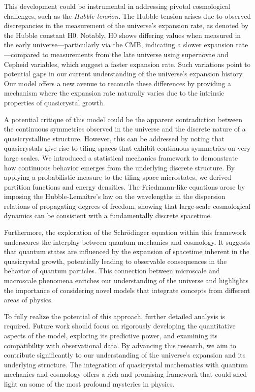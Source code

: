 \documentclass[sn-mathphys-num]{sn-jnl}%
\begin{document}
This development could be instrumental in addressing pivotal cosmological challenges, such as the \emph{Hubble tension}. The Hubble tension arises due to observed discrepancies in the measurement of the universe's expansion rate, as denoted by the Hubble constant H0. Notably, H0 shows differing values when measured in the early universe—particularly via the CMB, indicating a slower expansion rate—compared to measurements from the late universe using supernovae and Cepheid variables, which suggest a faster expansion rate. Such variations point to potential gaps in our current understanding of the universe's expansion history. Our model offers a new avenue to reconcile these differences by providing a mechanism where the expansion rate naturally varies due to the intrinsic properties of quasicrystal growth.

A potential critique of this model could be the apparent contradiction between the continuous symmetries observed in the universe and the discrete nature of a quasicrystalline structure. However, this can be addressed by noting that quasicrystals give rise to tiling spaces that exhibit continuous symmetries on very large scales. We introduced a statistical mechanics framework to demonstrate how continuous behavior emerges from the underlying discrete structure. By applying a probabilistic measure to the tiling space microstates, we derived partition functions and energy densities. The Friedmann-like equations arose by imposing the Hubble-Lemaître's law on the wavelengths in the dispersion relations of propagating degrees of freedom, showing that large-scale cosmological dynamics can be consistent with a fundamentally discrete spacetime.

Furthermore, the exploration of the Schr{\"o}dinger equation within this framework underscores the interplay between quantum mechanics and cosmology. It suggests that quantum states are influenced by the expansion of spacetime inherent in the quasicrystal growth, potentially leading to observable consequences in the behavior of quantum particles. This connection between microscale and macroscale phenomena enriches our understanding of the universe and highlights the importance of considering novel models that integrate concepts from different areas of physics.

To fully realize the potential of this approach, further detailed analysis is required. Future work should focus on rigorously developing the quantitative aspects of the model, exploring its predictive power, and examining its compatibility with observational data. 
By advancing this research, we aim to contribute significantly to our understanding of the universe's expansion and its underlying structure. The integration of quasicrystal mathematics with quantum mechanics and cosmology offers a rich and promising framework that could shed light on some of the most profound mysteries in physics.
\end{document}
